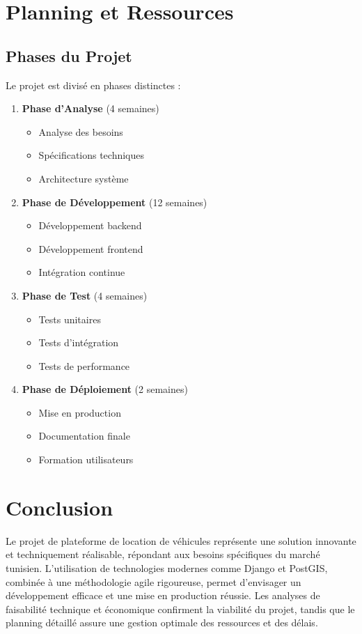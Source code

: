 \section{Planning et Ressources}
\subsection{Phases du Projet}
Le projet est divisé en phases distinctes :

\begin{enumerate}
    \item \textbf{Phase d'Analyse} (4 semaines)
    \begin{itemize}
        \item Analyse des besoins
        \item Spécifications techniques
        \item Architecture système
    \end{itemize}
    
    \item \textbf{Phase de Développement} (12 semaines)
    \begin{itemize}
        \item Développement backend
        \item Développement frontend
        \item Intégration continue
    \end{itemize}
    
    \item \textbf{Phase de Test} (4 semaines)
    \begin{itemize}
        \item Tests unitaires
        \item Tests d'intégration
        \item Tests de performance
    \end{itemize}
    
    \item \textbf{Phase de Déploiement} (2 semaines)
    \begin{itemize}
        \item Mise en production
        \item Documentation finale
        \item Formation utilisateurs
    \end{itemize}
\end{enumerate}

\section{Conclusion}
Le projet de plateforme de location de véhicules représente une solution innovante et techniquement réalisable, répondant aux besoins spécifiques du marché tunisien. L'utilisation de technologies modernes comme Django et PostGIS, combinée à une méthodologie agile rigoureuse, permet d'envisager un développement efficace et une mise en production réussie. Les analyses de faisabilité technique et économique confirment la viabilité du projet, tandis que le planning détaillé assure une gestion optimale des ressources et des délais.

